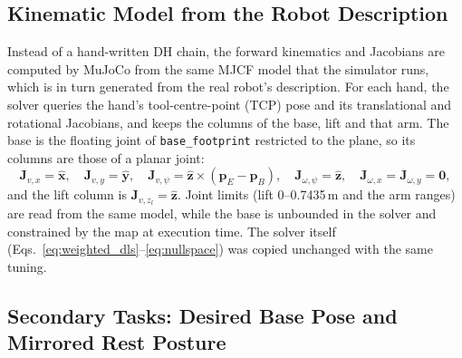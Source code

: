 \documentclass[12pt,a4paper]{article}
\begin{document}
\subsection{Kinematic Model from the Robot Description}

Instead of a hand-written DH chain, the forward kinematics and Jacobians are computed by MuJoCo from
the same MJCF model that the simulator runs, which is in turn generated from the real robot's
description. For each hand, the solver queries the hand's tool-centre-point (TCP) pose and its
translational and rotational Jacobians, and keeps the columns of the base, lift and that arm. The base
is the floating joint of \texttt{base\_footprint} restricted to the plane, so its columns are those of
a planar joint:
\begin{equation}
    \mathbf{J}_{v,x}=\hat{\mathbf{x}},\quad
    \mathbf{J}_{v,y}=\hat{\mathbf{y}},\quad
    \mathbf{J}_{v,\psi}=\hat{\mathbf{z}}\times\left(\mathbf{p}_E-\mathbf{p}_B\right),\quad
    \mathbf{J}_{\omega,\psi}=\hat{\mathbf{z}},\quad
    \mathbf{J}_{\omega,x}=\mathbf{J}_{\omega,y}=\mathbf{0},
    \label{eq:planar_base}
\end{equation}
and the lift column is $\mathbf{J}_{v,z_l}=\hat{\mathbf{z}}$. Joint limits (lift 0--0.7435\,m and the arm
ranges) are read from the same model, while the base is unbounded in the solver and constrained by the
map at execution time. The solver itself (Eqs.~\eqref{eq:weighted_dls}--\eqref{eq:nullspace}) was
copied unchanged with the same tuning.

\subsection{Secondary Tasks: Desired Base Pose and Mirrored Rest Posture}
\end{document}
